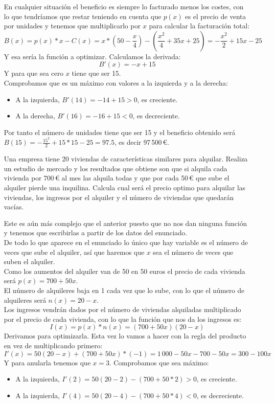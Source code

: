 \documentclass[a4paper,11pt,answers]{exam}
\begin{document}
\begin{questions}
\begin{questions}
\begin{solution}
En cualquier situación el beneficio es siempre lo facturado menos los costes, con lo que tendríamos que restar teniendo en cuenta que $p(x)$ es el precio de venta por unidades y tenemos que multiplicarlo por $x$ para calcular la facturación total:
\[B(x) = p(x) * x - C(x) = x*\left(50 - \frac{x}{4}\right) - \left(\frac{x^2}{4}+ 35x + 25 \right) = -\frac{x^2}{2} + 15x -25\]
Y esa sería la función a optimizar. Calculamos la derivada:
\[B'(x) = -x + 15\]
Y para que sea cero $x$ tiene que ser 15.\\
Comprobamos que es un máximo con valores a la izquierda y a la derecha:
\begin{itemize}
	\item A la izquierda, $B'(14) = -14 + 15 > 0$, es creciente.
	\item A la derecha, $B'(16) = -16 + 15 < 0$, es decreciente.
\end{itemize}
Por tanto el número de unidades tiene que ser 15 y el beneficio obtenido será $B(15) = -\frac{15^2}{2} + 15*15 - 25 = 97.5$, es decir 97\,500\,€.
\end{solution}

\question Una empresa tiene 20 viviendas de características similares para alquilar. Realiza un estudio de mercado y los resultados que obtiene son que si alquila cada vivienda por 700\,€ al mes las alquila todas y que por cada 50\,€ que sube el alquiler pierde una inquilina. Calcula cual será el precio optimo para alquilar las viviendas, los ingresos por el alquiler y el número de viviendas que quedarán vacías.
\begin{solution}
Este es aún más complejo que el anterior puesto que no nos dan ninguna función y tenemos que escribirlas a partir de los datos del enunciado.\\

De todo lo que aparece en el enunciado lo único que hay variable es el número de veces que sube el alquiler, así que haremos que $x$ sea el número de veces que suben el alquiler.\\

Como los aumentos del alquiler van de 50 en 50 euros el precio de cada vivienda será $p(x) = 700 + 50x$.\\
El número de alquileres baja en 1 cada vez que lo sube, con lo que el número de alquileres será $n(x) = 20 - x$.\\
Los ingresos vendrán dados por el número de viviendas alquiladas multiplicado por el precio de cada vivienda, con lo que la función que nos da los ingresos es:
\[I(x) = p(x)*n(x) = (700 + 50x) (20 - x)\]
Derivamos para optimizarla. Esta vez lo vamos a hacer con la regla del producto en vez de multiplicando primero:
\[I'(x) = 50(20 - x) + (700 + 50x)*(-1) = 1\,000 - 50 x -700 -50x = 300 - 100x\]
Y para anularla tenemos que $x=3$. Comprobamos que sea máximo:
\begin{itemize}
	\item A la izquierda, $I'(2) = 50(20 - 2) - (700+ 50*2) > 0$, es creciente.
	\item A la izquierda, $I'(4) = 50(20 - 4) - (700+ 50*4) < 0$, es decreciente.
\end{itemize}


\end{solution}
\end{questions}
\end{questions}
\end{document}
